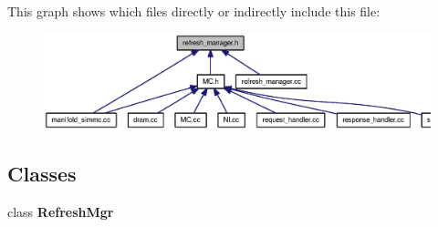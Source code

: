 This graph shows which files directly or indirectly include this file:\nopagebreak
\begin{figure}[H]
\begin{center}
\leavevmode
\includegraphics[width=318pt]{refresh__manager_8h__dep__incl}
\end{center}
\end{figure}
\subsection*{Classes}
\begin{CompactItemize}
\item 
class {\bf RefreshMgr}
\end{CompactItemize}

